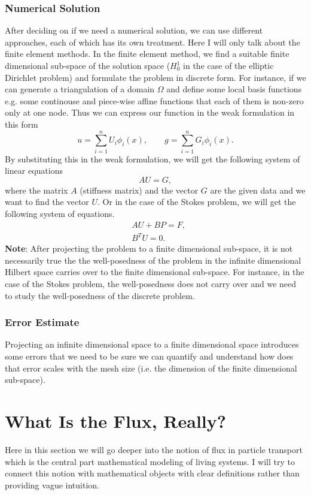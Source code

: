 \subsubsection{Numerical Solution}
After deciding on if we need a numerical solution, we can use different approaches, each of which has its own treatment. Here I will only talk about the finite element methods. In the finite element method, we find a suitable finite dimensional sub-space of the solution space ($ H_0^1 $ in the case of the elliptic Dirichlet problem) and formulate the problem in discrete form. For instance, if we can generate a triangulation of a domain $ \Omega $ and define some local basis functions e.g. some continouse and piece-wise affine functions that each of them is non-zero only at one node. Thus we can express our function in the weak formulation in this form
\[ u = \sum_{i=1}^{n}U_i \phi_i(x), \qquad g = \sum_{i=1}^{n}G_i \phi_i(x). \]
By substituting this in the weak formulation, we will get the following system of linear equations
\[ A U = G, \]
where the matrix $ A $ (stiffness matrix) and the vector $  G $ are the given data and we want to find the vector $ U $. Or in the case of the Stokes problem, we will get the following system of equations.
\begin{align*}
	&AU + BP = F, \\
	&B^T U = 0.
\end{align*}
\textbf{Note}: After projecting the problem to a finite dimensional sub-space, it is not necessarily true the the well-posedness of the problem in the infinite dimensional Hilbert space carries over to the finite dimensional sub-space. For instance, in the case of the Stokes problem, the well-posedness does not carry over and we need to study the well-posedness of the discrete problem.

\subsubsection{Error Estimate}
Projecting an infinite dimensional space to a finite dimensional space introduces some errors that we need to be sure we can quantify and understand how does that error scales with the mesh size (i.e. the dimension of the finite dimensional sub-space).



\section{What Is the Flux, Really?}
Here in this section we will go deeper into the notion of flux in particle transport which is the central part mathematical modeling of living systems. I will try to connect this notion with mathematical objects with clear definitions rather than providing vague intuition.

